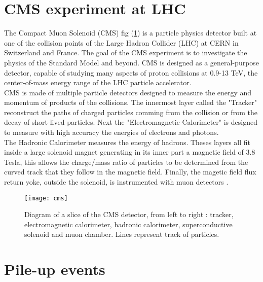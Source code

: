 \label{chap:premierchapitre}

\section{CMS experiment at LHC}

The Compact Muon Solenoid (CMS) fig (\ref{cms}) is a particle physics detector built at one of the collision points of the Large Hadron Collider
(LHC) at CERN in Switzerland and France. The goal of the CMS experiment is to investigate the physics of the Standard Model and beyond.
CMS is designed as a general-purpose detector, capable of studying many aspects of proton collisions at 0.9-13 TeV, the
center-of-mass energy range of the LHC particle accelerator.\\
CMS is made of multiple particle detectors designed to measure the energy and momentum of products of the collisions.
The innermost layer called the "Tracker" reconstruct the paths of charged particles comming from the collision or from the
decay of short-lived particles.
Next the "Electromagnetic Calorimeter" is designed to measure with high accuracy the energies of electrons and
photons.\\
The Hadronic Calorimeter measures the energy of hadrons.%
Theses layers all fit inside a large solenoid magnet generating in its inner part a magnetic field of 3.8 Tesla, this allows the charge/mass ratio of particles to be
determined from the curved track that they follow in the magnetic field.
Finally, the magetic field flux return yoke, outside the solenoid, is instrumented with muon detectors \cite{CMS2008}.

\begin{figure}[h!]
  \centering
  \texttt{[image: cms]}\\[1cm]
  \caption{Diagram of a slice of the CMS detector, from left to right : tracker, electromagnetic calorimeter, hadronic
  calorimeter, superconductive solenoid and muon chamber. Lines represent track of particles.}
  \label{cms}
\end{figure}


\section{Pile-up events}

